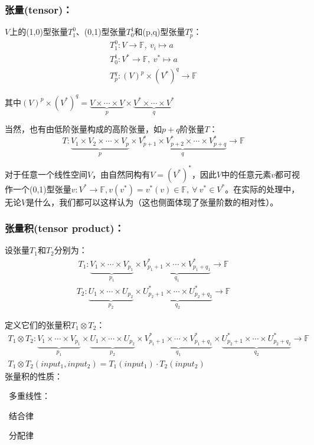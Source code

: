 \documentclass[zihao=5,UTF8]{report}
\def\F{\mathbb{F}}
\theoremstyle{mystyle} %
\begin{document}
\subsubsection{张量(tensor)：}
$V$上的(1,0)型张量$T_1^0$、(0,1)型张量$T_0^1$和(p,q)型张量$T_p^q$：
\begin{gather*}
    T_1^0: V\to \F,\ v_i \longmapsto a\\
    T_0^1: V^* \to \F,\ v^* \longmapsto a\\ 
    T_p^q: (V)^p \times (V^*)^q  \longrightarrow \F
\end{gather*}
{\par\color{gray}\small
其中$(V)^p \times (V^*)^q = \underbrace{V\times\cdots\times V}_p\times\underbrace{V^*\times\cdots\times V^*}_q$
\par}
当然，也有由低阶张量构成的高阶张量，如$p+q$阶张量$T$：
\begin{equation*}
    T: \underbrace{V_1 \times V_2 \times\cdots\times V_p}_p\times\underbrace{V_{p+1}^* \times V_{p+2}^* \times\cdots\times V_{p+q}^*}_q\longrightarrow \F
\end{equation*}\par
对于任意一个线性空间$V$，由自然同构有$V = (V^*)^*$，因此$V$中的任意元素$v$都可视作一个(0,1)型张量$v:V^* \to \F, v(v^*) = v^*(v) \in \F,\ \forall\ v^* \in V^*$。在实际的处理中，无论$V$是什么，我们都可以这样认为（这也侧面体现了张量阶数的相对性）。
\subsubsection{张量积(tensor product)：}
设张量$T_1$和$T_2$分别为：
\begin{gather*}
    T_1: \underbrace{V_1 \times\cdots\times V_{p_1}}_{p_1}\times\underbrace{V_{p_1+1}^* \times\cdots\times V_{p_1+q_1}^*}_{q_1}\longrightarrow \F 
\end{gather*}
\begin{gather*}
    T_2: \underbrace{U_1 \times\cdots\times U_{p_2}}_{p_2}\times\underbrace{U_{p_2+1}^* \times\cdots\times U_{p_2+q_2}^*}_{q_2}\longrightarrow \F
\end{gather*}

定义它们的张量积$T_1 \otimes T_2$：
\begin{gather*}
    T_1 \otimes T_2: \underbrace{V_1 \times\cdots\times V_{p_1}}_{p_1}\times\underbrace{U_1 \times\cdots\times U_{p_2}}_{p_2}\times\underbrace{V_{p_1+1}^* \times\cdots\times V_{p_1+q_1}^*}_{q_1}\times \underbrace{U_{p_2+1}^* \times\cdots\times U_{p_2+q_2}^*}_{q_2}\longrightarrow \F \\ 
    T_1 \otimes T_2 (input_1,input_2) = T_1(input_1) \cdot T_2(input_2) 
\end{gather*}
张量积的性质：
\par{}\ 多重线性：    \par
{}\  结合律   \par
{}\  分配律   
\end{document}
